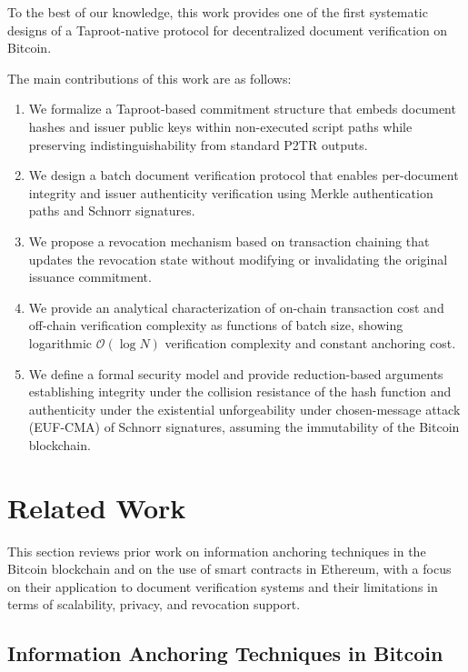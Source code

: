 \documentclass[preprint,12pt]{elsarticle}
\begin{document}
To the best of our knowledge, this work provides one of the first systematic designs of a Taproot-native protocol for decentralized document verification on Bitcoin.

The main contributions of this work are as follows:

\begin{enumerate}
    \item We formalize a Taproot-based commitment structure that embeds document hashes and issuer public keys within non-executed script paths while preserving indistinguishability from standard P2TR outputs.
    
    \item We design a batch document verification protocol that enables per-document integrity and issuer authenticity verification using Merkle authentication paths and Schnorr signatures.
    
    \item We propose a revocation mechanism based on transaction chaining that updates the 
    revocation state without modifying or invalidating the original issuance commitment.
    
    \item We provide an analytical characterization of on-chain transaction cost and off-chain verification complexity as functions of batch size, showing logarithmic $\mathcal{O}(\log N)$ verification complexity and constant anchoring cost.
    
    \item We define a formal security model and provide reduction-based arguments establishing integrity under the collision resistance of the hash function and authenticity under the existential unforgeability under chosen-message attack (EUF-CMA) of Schnorr signatures, assuming the immutability of the Bitcoin blockchain.
\end{enumerate}


\section{Related Work}
\label{sec.relatedwork}

This section reviews prior work on information anchoring techniques in the Bitcoin blockchain and on the use of smart contracts in Ethereum, with a focus on their application to document verification systems and their limitations in terms of scalability, privacy, and revocation support.

\subsection{Information Anchoring Techniques in Bitcoin}
\label{sec.methodsbitcoin}
\end{document}
